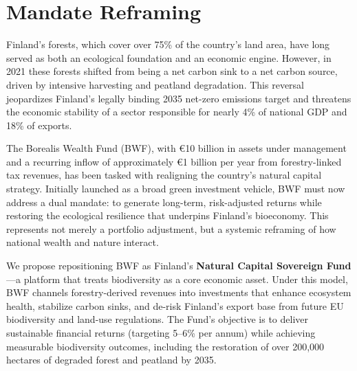 


\section*{Mandate Reframing}

Finland’s forests, which cover over 75\% of the country’s land area, have long served as both an ecological foundation and an economic engine. However, in 2021 these forests shifted from being a net carbon sink to a net carbon source, driven by intensive harvesting and peatland degradation. This reversal jeopardizes Finland’s legally binding 2035 net-zero emissions target and threatens the economic stability of a sector responsible for nearly 4\% of national GDP and 18\% of exports. 

The Borealis Wealth Fund (BWF), with €10 billion in assets under management and a recurring inflow of approximately €1 billion per year from forestry-linked tax revenues, has been tasked with realigning the country’s natural capital strategy. Initially launched as a broad green investment vehicle, BWF must now address a dual mandate: to generate long-term, risk-adjusted returns while restoring the ecological resilience that underpins Finland’s bioeconomy. This represents not merely a portfolio adjustment, but a systemic reframing of how national wealth and nature interact.

We propose repositioning BWF as Finland’s \textbf{Natural Capital Sovereign Fund}—a platform that treats biodiversity as a core economic asset. Under this model, BWF channels forestry-derived revenues into investments that enhance ecosystem health, stabilize carbon sinks, and de-risk Finland’s export base from future EU biodiversity and land-use regulations. The Fund’s objective is to deliver sustainable financial returns (targeting 5–6\% per annum) while achieving measurable biodiversity outcomes, including the restoration of over 200,000 hectares of degraded forest and peatland by 2035.

